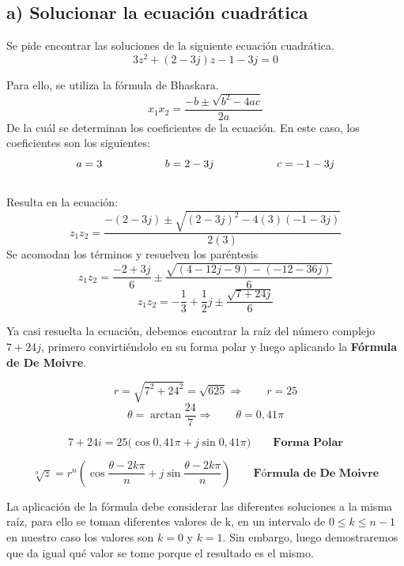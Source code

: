 \documentclass[a4paper, 12pt]{article}
\begin{document}
\subsection{a) Solucionar la ecuación cuadrática}


Se pide encontrar las soluciones de la siguiente ecuación cuadrática. 
\[3z^2 + (2-3j) z -1-3j= 0 \]    

Para ello, se utiliza la fórmula de Bhaskara.
\[ x_1x_2 = \frac{-b \pm \sqrt{b^2 - 4ac}}{2a}\]
De la cuál se determinan los coeficientes de la ecuación. En este caso, los coeficientes son los siguientes: 
\begin{equation*}
\centering
a= 3 \hspace{2cm}  b= 2-3j \hspace{2cm}  c= -1-3j    
\end{equation*}
\\
Resulta en la ecuación:
\[z_1z_2= \frac{-(2-3j) \pm \sqrt{(2-3j)^2-4(3)(-1-3j)}}{2(3)}\]
Se acomodan los términos y resuelven los paréntesis
\[z_1z_2= \frac{-2+3j}{6} \pm \frac{\sqrt{(4-12j-9)- (-12-36j)}}{6}\]
\[z_1z_2= -\frac{1}{3}+\frac{1}{2}j \pm \frac{\sqrt{7+24j}}{6}\]

Ya casi resuelta la ecuación, debemos encontrar la raíz del número
complejo $7 + 24j$, primero convirtiéndolo en su forma polar y luego 
aplicando la \textbf{Fórmula de De Moivre}.

\[r= \sqrt{7^2+24^2} = \sqrt{625} \Rightarrow \qquad r= 25 \] 
\[\theta = \arctan\frac{24}{7} \Rightarrow \qquad\theta= 0,41\pi\]

\begin{equation*}
    7+24i=25(\cos{0,41\pi} +j\sin{0,41\pi)} \qquad \textbf{Forma Polar}
\end{equation*}
\[\]

\begin{equation*}
    \sqrt[n]{z}=r^n(\cos{\frac{\theta-2k\pi}{n}}+
    j\sin{\frac{\theta-2k\pi}{n}}) \qquad\textbf{Fórmula de De Moivre}
\end{equation*}
\newpage

La aplicación de la fórmula debe considerar las diferentes soluciones 
a la misma raíz, para ello se toman diferentes valores de k, en un 
intervalo de $0 \leq k \leq n-1$ en nuestro caso los valores son 
$k= 0$ y $k=1$. Sin embargo, luego demostraremos que da igual qué 
valor se tome porque el resultado es el mismo.
\end{document}
